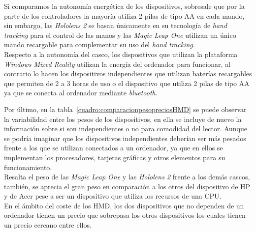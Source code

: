 Si comparamos la autonomía energética de los dispositivos, sobresale que por la parte de los controladores la mayoría utiliza 2 pilas de tipo AA en cada mando, sin embargo, las \textit{Hololens 2} se basan únicamente en su tecnología de \textit{hand tracking} para el control de las manos y las \textit{Magic Leap One} utilizan un único mando recargable para complementar su uso del \textit{hand tracking}. \\

Respecto a la autonomía del casco, los dispositivos que utilizan la plataforma \textit{Windows Mixed Reality} utilizan la energía del ordenador para funcionar, al contrario lo hacen los dispositivos independientes que utilizan baterías recargables que permiten de 2 a 3 horas de uso o el dispositivo \textitAcer que utiliza 2 pilas de tipo AA ya que se conecta al ordenador mediante \textit{bluetooth}.\\

\begin{table}[ht]
\centering
{}
\caption{Pesos y precios de los dispositivos. }
\label{cuadro:comparacionpesopreciosHMD}
\end{table}


Por último, en la tabla~\ref{cuadro:comparacionpesopreciosHMD} se puede observar la variabilidad entre los pesos de los dispositivos, en ella se incluye de nuevo la información sobre si son independientes o no para comodidad del lector. Aunque se podría imaginar que los dispositivos independientes deberían ser más pesados frente a los que se utilizan conectados a un ordenador, ya que en ellos se implementan los procesadores, tarjetas gráficas y otros elementos para su funcionamiento.\\ 

Resalta el peso de las \textit{Magic Leap One} y las \textit{Hololens 2} frente a los demás cascos, también, se aprecia el gran peso en comparación a los otros del dispositivo de HP y de Acer pese a ser un dispositivo que utiliza los recursos de una CPU.\\

En el ámbito del coste de los HMD, los dos dispositivos que no dependen de un ordenador tienen un precio que sobrepasa los otros dispositivos los cuales tienen un precio cercano entre ellos.